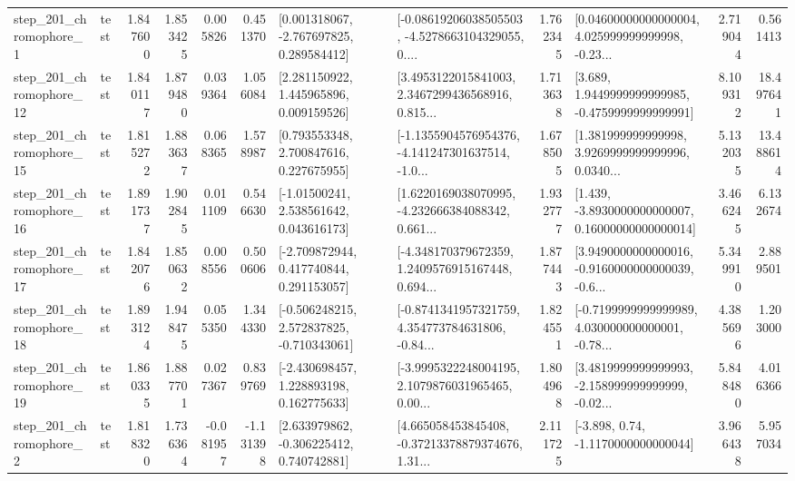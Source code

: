 \begin{tabular}{llrrrrllrlrr}
   step\_201\_chromophore\_1 &      test &      1.847600 &    1.853425 &      0.005826 &  0.451370 &    [0.001318067, -2.767697825, 0.289584412] &  [-0.08619206038505503, -4.5278663104329055, 0.... &       1.762345 &  [0.04600000000000004, 4.025999999999998, -0.23... &            2.719044 &          0.561413 \\
  step\_201\_chromophore\_12 &      test &      1.840117 &    1.879480 &      0.039364 &  1.056084 &     [2.281150922, 1.445965896, 0.009159526] &  [3.4953122015841003, 2.3467299436568916, 0.815... &       1.713638 &   [3.689, 1.9449999999999985, -0.4759999999999991] &            8.109312 &         18.497641 \\
  step\_201\_chromophore\_15 &      test &      1.815272 &    1.883637 &      0.068365 &  1.578987 &     [0.793553348, 2.700847616, 0.227675955] &  [-1.1355904576954376, -4.141247301637514, -1.0... &       1.678505 &  [1.381999999999998, 3.9269999999999996, 0.0340... &            5.132035 &         13.488614 \\
  step\_201\_chromophore\_16 &      test &      1.891737 &    1.902845 &      0.011109 &  0.546630 &     [-1.01500241, 2.538561642, 0.043616173] &  [1.6220169038070995, -4.232666384088342, 0.661... &       1.932777 &  [1.439, -3.8930000000000007, 0.16000000000000014] &            3.466245 &          6.132674 \\
  step\_201\_chromophore\_17 &      test &      1.842076 &    1.850632 &      0.008556 &  0.500606 &    [-2.709872944, 0.417740844, 0.291153057] &  [-4.348170379672359, 1.2409576915167448, 0.694... &       1.877443 &  [3.9490000000000016, -0.9160000000000039, -0.6... &            5.349910 &          2.889501 \\
  step\_201\_chromophore\_18 &      test &      1.893124 &    1.948475 &      0.055350 &  1.344330 &   [-0.506248215, 2.572837825, -0.710343061] &  [-0.8741341957321759, 4.354773784631806, -0.84... &       1.824551 &  [-0.7199999999999989, 4.030000000000001, -0.78... &            4.385696 &          1.203000 \\
  step\_201\_chromophore\_19 &      test &      1.860335 &    1.887701 &      0.027367 &  0.839769 &    [-2.430698457, 1.228893198, 0.162775633] &  [-3.9995322248004195, 2.1079876031965465, 0.00... &       1.804968 &  [3.4819999999999993, -2.158999999999999, -0.02... &            5.848480 &          4.016366 \\
   step\_201\_chromophore\_2 &      test &      1.818320 &    1.736364 &     -0.081957 & -1.131398 &    [2.633979862, -0.306225412, 0.740742881] &  [4.665058453845408, -0.37213378879374676, 1.31... &       2.111725 &                [-3.898, 0.74, -1.1170000000000044] &            3.966438 &          5.957034 \\

\end{tabular}
